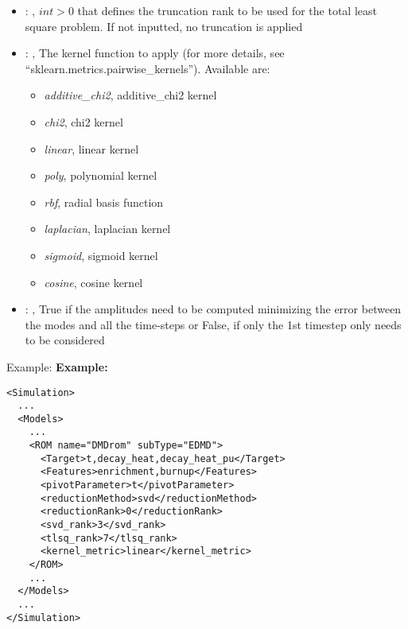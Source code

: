 \begin{itemize}
    \item {}: , 
      $int > 0$ that defines the truncation rank to be used for the total
      least square problem. If not inputted, no truncation is applied

    \item {}: , 
      The kernel function to apply (for more details, see ``sklearn.metrics.pairwise\_kernels'').
      Available are:                                                   \begin{itemize}
      \item \textit{additive\_chi2}, additive\_chi2 kernel
      \item \textit{chi2}, chi2 kernel                                                     \item
      \textit{linear}, linear kernel                                                     \item
      \textit{poly}, polynomial kernel                                                     \item
      \textit{rbf}, radial basis function                                                     \item
      \textit{laplacian}, laplacian kernel                                                     \item
      \textit{sigmoid}, sigmoid kernel                                                     \item
      \textit{cosine}, cosine kernel                                                   \end{itemize}

    \item {}: , 
      True if the amplitudes need to be computed minimizing the error
      between the modes and all the time-steps or False, if only the 1st timestep only needs to be
      considered
  \end{itemize}

\hspace{24pt}
Example:
\textbf{Example:}
\begin{lstlisting}[style=XML,morekeywords={name,subType}]
<Simulation>
  ...
  <Models>
    ...
    <ROM name="DMDrom" subType="EDMD">
      <Target>t,decay_heat,decay_heat_pu</Target>
      <Features>enrichment,burnup</Features>
      <pivotParameter>t</pivotParameter>
      <reductionMethod>svd</reductionMethod>
      <reductionRank>0</reductionRank>
      <svd_rank>3</svd_rank>
      <tlsq_rank>7</tlsq_rank>
      <kernel_metric>linear</kernel_metric>
    </ROM>
    ...
  </Models>
  ...
</Simulation>
\end{lstlisting}

